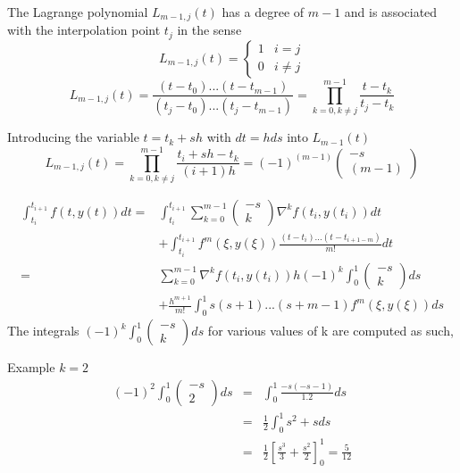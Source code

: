 \begin{definition}
The Lagrange polynomial $L_{m-1,j}(t)$ has a degree of $m-1$ and is associated with the interpolation point $t_j$ in the sense
\[
L_{m-1,j}(t)=\left\{
                \begin{array}{ll}
                  1 & i=j\\
                  0 & i\neq j
                      \end{array}
              \right.
\]
\begin{equation}
    L_{m-1,j}(t)=\frac{(t-t_0)...(t-t_{m-1})}{(t_j-t_0)...(t_j-t_{m-1})}=\prod_{k=0, k \neq j}^{m-1} \frac{t-t_k}{t_j-t_k}
\end{equation}

\end{definition}

Introducing the variable $t=t_k+sh$ with $dt=hds$ into $L_{m-1}(t)$ 
\begin{equation}
    L_{m-1,j}(t)=\prod_{k=0, k \neq j}^{m-1}  \frac{t_i+sh-t_k}{(i+1)h}= (-1)^{(m-1)} \left(\begin{array}{c}-s \\ (m-1) \end{array}\right)
\end{equation}


\begin{eqnarray*}
\int_{t_i}^{t_{i+1}} f(t,y(t)) dt=& \int_{t_i}^{t_{i+1}}\sum_{k=0}^{m-1}\left(\begin{array}{c}-s \\ k \end{array}\right) \nabla^k f(t_i,y(t_i))dt\\
& +\int_{t_i}^{t_{i+1}}f^{m}(\xi,y(\xi))\frac{(t-t_i)...(t-t_{i+1-m})}{m!}dt \\
 =&\sum_{k=0}^{m-1}\nabla^k  f(t_i,y(t_i))h(-1)^k\int_{0}^{1}\left(\begin{array}{c}-s \\ k \end{array}\right)ds\\
 & +\frac{h^{m+1}}{m!}\int_{0}^{1}s(s+1)...(s+m-1)f^{m}(\xi,y(\xi))ds
 \end{eqnarray*}
The integrals $(-1)^k\int_{0}^{1}\left(\begin{array}{c}-s \\ k \end{array}\right)ds$ for various values of k are computed as such,
\begin{example}
Example $k=2$
\begin{eqnarray*}
(-1)^2\int_{0}^{1}\left(\begin{array}{c}-s \\ 2 \end{array}\right)ds
&=& \int_{0}^{1} \frac{-s(-s-1)}{1.2}ds\\
&=& \frac{1}{2} \int_{0}^{1} s^2+s ds\\
&=& \frac{1}{2} \left[ \frac{s^3}{3}+\frac{s^2}{2}\right]^{1}_{0}=\frac{5}{12}
\end{eqnarray*}
\end{example}

